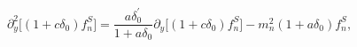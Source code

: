 \begin{equation}
\partial_y^2 \Big[(1+c \delta_0) f_n^S \Big]=
\frac{a \delta_0^\prime}{1+a\delta_0} \partial_y \Big[ (1+c \delta_0)
f_n^S \Big] 
-m_n^2 (1+a
\delta_0)f_n^S,
\end{equation}

